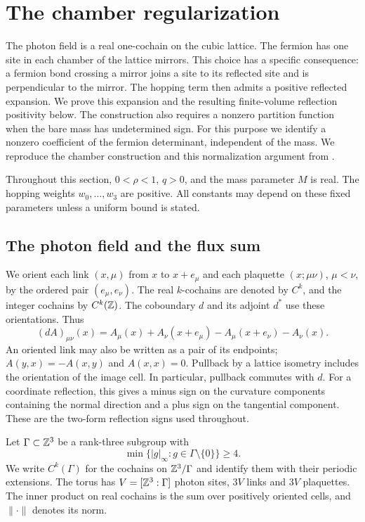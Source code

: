 \section{The chamber regularization}\label{sec:regularization}

The photon field is a real one-cochain on the cubic lattice. The fermion
has one site in each chamber of the lattice mirrors. This choice has a
specific consequence: a fermion bond crossing a mirror joins a site to
its reflected site and is perpendicular to the mirror. The hopping term
then admits a positive reflected expansion. We prove this expansion and
the resulting finite-volume reflection positivity below. The construction
also requires a nonzero partition function when the bare mass has
undetermined sign. For this purpose we identify a nonzero coefficient
of the fermion determinant, independent of the mass. We reproduce the
chamber construction and this normalization argument from
\cite[Sections~2.1--2.3, 3.1--3.5 and 4.1--4.4]{ChamberQED}.

Throughout this section, $0<\rho<1$, $q>0$, and the mass parameter $M$
is real. The hopping weights $w_0,\ldots,w_3$ are positive. All constants may depend on these fixed parameters unless a uniform
bound is stated.

\subsection{The photon field and the flux sum}\label{subsec:reg-photon}

We orient each link $(x,\mu)$ from $x$ to $x+e_\mu$ and each plaquette
$(x;\mu\nu)$, $\mu<\nu$, by the ordered pair $(e_\mu,e_\nu)$.
The real $k$-cochains are denoted by $C^k$, and the integer cochains by
$C^k(\mathbb Z)$. The coboundary $d$ and its adjoint $d^*$ use these
orientations. Thus
\begin{equation}\label{eq:reg-coboundary}
 (dA)_{\mu\nu}(x)=A_\mu(x)+A_\nu(x+e_\mu)
                     -A_\mu(x+e_\nu)-A_\nu(x).
\end{equation}
An oriented link may also be written as a pair of its endpoints;
$A(y,x)=-A(x,y)$ and $A(x,x)=0$. Pullback by a lattice isometry includes
the orientation of the image cell. In particular, pullback commutes
with $d$. For a coordinate reflection, this gives a minus sign on
the curvature components containing the normal direction and a
plus sign on the tangential component. These are the two-form
reflection signs used throughout.

Let $\Gamma\subset\mathbb Z^3$ be a rank-three subgroup with
\[
 \min\{|g|_\infty:g\in\Gamma\setminus\{0\}\}\ge4.
\]
We write $C^k(\Gamma)$ for the cochains on $\mathbb Z^3/\Gamma$ and identify
them with their periodic extensions. The torus has
$V=[\mathbb Z^3:\Gamma]$ photon sites, $3V$ links and $3V$ plaquettes. The
inner product on real cochains is the sum over positively oriented
cells, and $\|\cdot\|$ denotes its norm.

